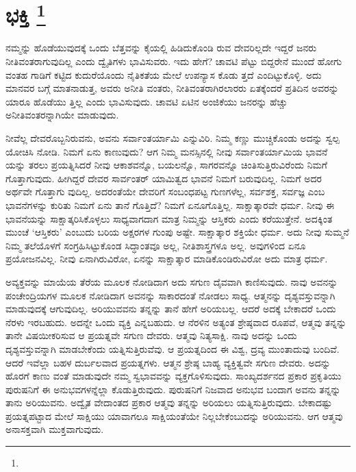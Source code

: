 
\chapter[ಭಕ್ತಿ ]{ಭಕ್ತಿ \protect\footnote{}}

ನಮ್ಮನ್ನು ಹೊಡೆಯುವುದಕ್ಕೆ ಒಂದು ಬೆತ್ತವನ್ನು ಕೈಯಲ್ಲಿ ಹಿಡಿದುಕೊಂಡಿ ರುವ ದೇವರಿಲ್ಲದೇ ಇದ್ದರೆ ಜನರು ನೀತಿವಂತರಾಗುವುದಿಲ್ಲ ಎಂದು ದ್ವೈತಿಗಳು ಭಾವಿಸುವರು. ಇದು ಹೇಗೆ? ಚಾವಟಿ ಪೆಟ್ಟು ಬಿದ್ದರೇನೆ ಮುಂದೆ ಹೋಗು ವಂತಹ ಗಾಡಿಗೆ ಕಟ್ಟಿದ ಕುದುರೆಯೊಂದು ನೈತಿಕತೆಯ ಮೇಲೆ ಉಪನ್ಯಾಸ ಕೊಡು ತ್ತದೆ ಎಂದಿಟ್ಟುಕೊಳ್ಳಿ. ಅದು ಮಾನವರ ಬಗ್ಗೆ ಮಾತನಾಡುತ್ತ, ಅವರು ಅನೀತಿ ವಂತರು, ನೀತಿವಂತರಾಗಿರಲಾರರು ಏತಕ್ಕೆಂದರೆ ಪ್ರತಿದಿನ ಅವರನ್ನು ಯಾರೂ ಹೊಡೆಯು ತ್ತಿಲ್ಲ ಎಂದು ಭಾವಿಸುವುದು. ಚಾವಟಿ ಏಟಿನ ಅಂಜಿಕೆಯು ಜನರನ್ನು ಹೆಚ್ಚು ಅನೀತಿವಂತರನ್ನಾಗಿಯೇ ಮಾಡುವುದು.

ನೀವೆಲ್ಲ ದೇವರೊಬ್ಬನಿರುವನು, ಅವನು ಸರ್ವಾಂತರ್ಯಾಮಿ ಎನ್ನುವಿರಿ. ನಿಮ್ಮ ಕಣ್ಣು ಮುಚ್ಚಿಕೊಂಡು ಅದನ್ನು ಸ್ವಲ್ಪ ಯೋಚಿಸಿ ನೋಡಿ. ನಿಮಗೆ ಏನು ಕಾಣುವುದು? ಆಗ ನಿಮ್ಮ ಮನಸ್ಸಿನಲ್ಲಿ ನೀವು ಸರ್ವಾಂತರ್ಯಾಮಿಯ ಭಾವನೆ ಯನ್ನು ತರಲು ಪ್ರಯತ್ನಿಸಿದರೆ ನೀವು ಆಕಾಶವನ್ನೊ, ಬಯಲನ್ನೊ, ಸಾಗರವನ್ನೊ ಚಿಂತಿಸುತ್ತಿರುವಿರೆಂದು ನಿಮಗೆ ಗೊತ್ತಾಗುವುದು. ಹೀಗಿದ್ದರೆ ದೇವರ ಸಾರ್ವಂತರ್ ಯಾಮಿತ್ವದ ಭಾವನೆ ನಿಮಗೆ ಬರುವುದಿಲ್ಲ. ನಿಮಗೆ ಅದರ ಅರ್ಥವೇ ಗೊತ್ತಾಗು ವುದಿಲ್ಲ. ಅದರಂತೆಯೇ ದೇವರಿಗೆ ಸಂಬಂಧಪಟ್ಟ ಗುಣಗಳೆಲ್ಲ, ಸರ್ವಶಕ್ತ, ಸರ್ವಜ್ಞ ಎಂಬ ಭಾವನೆಗಳನ್ನು ಕುರಿತು ನಿಮಗೆ ಏನು ತಾನೆ ಗೊತ್ತಿದೆ? ನಿಮಗೆ ಏನೂಗೊತ್ತಿಲ್ಲ. ಸಾಕ್ಷಾತ್ಕಾರವೇ ಧರ್ಮ. ನೀವು ಈ ಭಾವನೆಯನ್ನು ಸಾಕ್ಷಾತ್ಕರಿಸಿಕೊಳ್ಳಲು ಸಾಧ್ಯವಾಗದಾಗ ಮಾತ್ರ ನಿಮ್ಮನ್ನು ಆಸ್ತಿಕರು ಎಂದು ಕರೆಯುತ್ತೇನೆ. ಅದಕ್ಕಿಂತ ಮುಂಚೆ ‘ಆಸ್ತಿಕರು’ ಎಂಬುದು ಬರಿಯ ಅಕ್ಷರಗಳ ಗುಂಪು ಅಷ್ಟೇ. ಸಾಕ್ಷಾತ್ಕಾರ ಶಕ್ತಿಯೇ ಧರ್ಮ. ಅದು ನೀವು ಸುಮ್ಮನೆ ನಿಮ್ಮ ತಲೆಯೊಳಗೆ ಸಂಗ್ರಹಿಸಿಟ್ಟುಕೊಂಡ ಸಿದ್ಧಾಂತವೂ ಅಲ್ಲ, ನೀತಿಶಾಸ್ತ್ರಗಳೂ ಅಲ್ಲ. ಅವುಗಳಿಂದ ಏನೂ ಪ್ರಯೋಜನವಿಲ್ಲ. ನೀವು ಏನಾಗಿರುವಿರೋ, ಏನನ್ನು ಸಾಕ್ಷಾತ್ಕಾರ ಮಾಡಿಕೊಂಡಿರುವಿರೋ ಅದು ಮಾತ್ರ ಧರ್ಮ.

ಅವ್ಯಕ್ತವನ್ನು ಮಾಯೆಯ ತೆರೆಯ ಮೂಲಕ ನೋಡಿದಾಗ ಅದು ಸಗುಣ ದೈವವಾಗಿ ಕಾಣಿಸುವುದು. ನಾವು ಅವನನ್ನು ಪಂಚೇಂದ್ರಿಯಗಳ ಮೂಲಕ ನೋಡಿದಾಗ ಅವನನ್ನು ಸಾಕಾರದಂತೆ ನೋಡಲು ಸಾಧ್ಯ. ಆತ್ಮನನ್ನು ದೃಶ್ಯವಸ್ತುವನ್ನಾಗಿ ಮಾಡುವುದಕ್ಕೆ ಆಗುವುದಿಲ್ಲ. ಅರಿಯುವವನು ತನ್ನನ್ನು ತಾನೆ ಹೇಗೆ ಅರಿಯಬಲ್ಲ. ಆದರೆ ಅದಕ್ಕೆ ಬೇಕಾದರೆ ಒಂದು ನೆರಳು ಇರಬಹುದು. ಅದನ್ನೇ ಒಂದು ವ್ಯಕ್ತಿ ಎನ್ನಬಹುದು. ಆ ನೆರಳಿನ ಅತ್ಯಂತ ಶ್ರೇಷ್ಠವಾದ ರೂಪವೆ, ಆತ್ಮವು ತನ್ನನ್ನು ತಾನೇ ವಿಷಯೀಕರಿಸುವ ಆ ಪ್ರಯತ್ನವೇ ಸಗುಣ ದೇವರು. ಆತ್ಮವು ನಿತ್ಯಸಾಕ್ಷಿ. ನಾವು ಅದನ್ನು ಒಂದು ದೃಶ್ಯವಸ್ತುವನ್ನಾಗಿ ಮಾಡಬೇಕೆಂದು ಯತ್ನಿಸುತ್ತಿರುವೆವು. ಆ ಪ್ರಯತ್ನದಿಂದ ಈ ವಿಶ್ವ, ದ್ರವ್ಯ ಮುಂತಾದುವು ಬಂದಿವೆ. ಆದರೆ ಇವೆಲ್ಲಾ ಬಹಳ ದುರ್ಬಲವಾದ ಪ್ರಯತ್ನಗಳು. ಆತ್ಮನ ಶ್ರೇಷ್ಠ ಬಾಹ್ಯ ವ್ಯಕ್ತಿತ್ವವೇ ಸಗುಣ ದೇವರು. ಅದನ್ನು ಹೊರಗೆ ಕಾಣು ವಂತೆ ಮಾಡುವುದೇ ನಮ್ಮ ಸ್ವಭಾವವನ್ನು ವ್ಯಕ್ತಗೊಳಿಸುವುದು. ಸಾಂಖ್ಯದರ್ಶನದ ಪ್ರಕಾರ ಪ್ರಕೃತಿಯು ಪುರುಷನಿಗೆ ಈ ಅನುಭವಗಳನ್ನೆಲ್ಲಾ ಕೊಡುತ್ತಿರುವುದು. ಪುರುಷನಿಗೆ ನಿಜವಾದ ಅನುಭವ ಬಂದಾಗ ಅವನು ತನ್ನನ್ನು ತಾನು ಅರಿಯುವನು. ಅದ್ವೈತ ವೇದಾಂತದ ಪ್ರಕಾರ ಆತ್ಮವು ತನ್ನನ್ನು ಅರಿಯಲು ಯತ್ನಿಸುತ್ತಿರುವುದು. ಬೇಕಾದಷ್ಟು ಪ್ರಯತ್ನಪಟ್ಟಾದ ಮೇಲೆ ಸಾಕ್ಷಿಯು ಯಾವಾಗಲೂ ಸಾಕ್ಷಿಯಂತೆಯೇ ನಿಲ್ಲಬೇಕೆಂಬುದನ್ನು ಅರಿಯುವನು. ಆಗ ಆತ್ಮವು ಅನಾಸಕ್ತವಾಗಿ ಮುಕ್ತವಾಗುವುದು.

